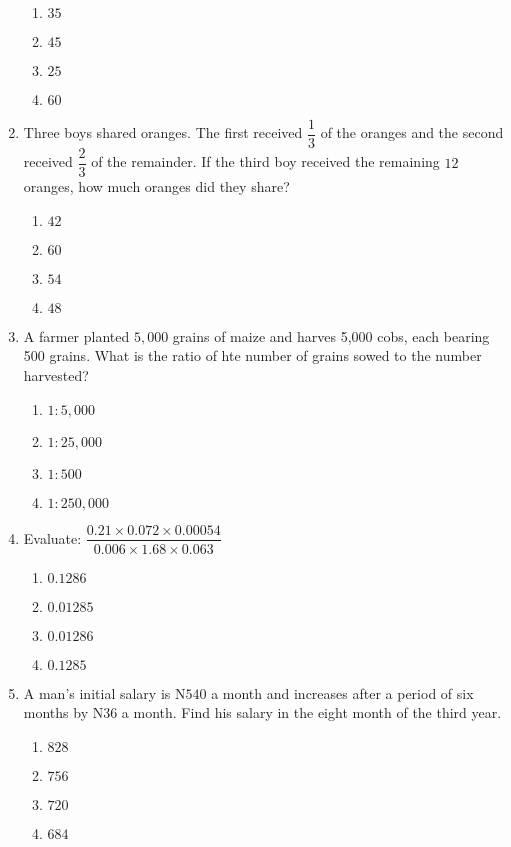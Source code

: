 \begin{multicols}{2}
\begin{enumerate}[label={\arabic*.}]
    \begin{enumerate}[label={\Alph*.}]
    \item \(35\)
    \item \(45\)
    \item \(25\)
    \item \(60\)
    \end{enumerate}
\item Three boys shared oranges. The first received \(\dfrac{1}{3}\) of the oranges and the second received \(\dfrac{2}{3}\)
of the remainder. If the third boy received the remaining \(12\) oranges, how much oranges did they share?
    \begin{enumerate}[label={\Alph*.}]
    \item \(42\)
    \item \(60\)
    \item \(54\)
    \item \(48\)
    \end{enumerate}
\item A farmer planted \(5,000\) grains of maize and harves 5,000 cobs, each bearing 500 grains. What is the ratio of hte number of grains sowed 
to the number harvested? 
    \begin{enumerate}[label={\Alph*.}]
    \item \(1:5,000\)
    \item \(1:25,000\)
    \item \(1:500\)
    \item \(1:250,000\)
    \end{enumerate}
\item Evaluate: \(\dfrac{0.21 \times 0.072 \times 0.00054}{0.006 \times 1.68 \times 0.063}\)
    \begin{enumerate}[label={\Alph*.}]
    \item \(0.1286\)
    \item \(0.01285\)
    \item \(0.01286\)
    \item \(0.1285\)
    \end{enumerate}
\item A man's initial salary is N\(540\) a month and increases after a period of six months by N36 a
month. Find his salary in the eight month of the third year. 
    \begin{enumerate}[label={\Alph*.}]
    \item \(828\)
    \item \(756\)
    \item \(720\)
    \item \(684\)

\end{enumerate}
\end{enumerate}
\end{multicols}
